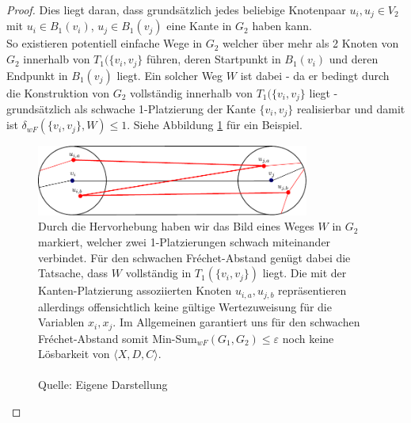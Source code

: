 \documentclass[a4paper, 12pt, twoside]{article}
\theoremstyle{Format1} %
\begin{document}
\begin{proof}
Dies liegt daran, dass grundsätzlich jedes beliebige Knotenpaar $u_{i}, u_{j} \in V_2$ mit $u_{i} \in B_1(v_i)$, $u_{j} \in B_1(v_j)$ eine Kante in $G_2$ haben kann.
\\
So existieren potentiell einfache Wege in $G_2$ welcher über mehr als 2 Knoten von $G_2$ innerhalb von $T_1(\{v_i, v_j\}$ führen, deren Startpunkt in $B_1(v_i)$ und deren Endpunkt in $B_1(v_j)$ liegt.
Ein solcher Weg $W$ ist dabei - da er bedingt durch die Konstruktion von $G_2$ vollständig innerhalb von $T_1(\{v_i, v_j\}$ liegt - grundsätzlich als
schwache 1-Platzierung der Kante $\{v_i, v_j\}$ realisierbar und damit ist $\delta_{wF}(\{v_i, v_j\}, W) \leq 1$. Siehe Abbildung \ref{chapter_4_example_0} für ein Beispiel.

\begin{figure}[H]
    \centering
    \includegraphics[width=0.8\textwidth]{chapter_4_example_0.pdf}
    \caption{Durch die Hervorhebung haben wir das Bild eines Weges $W$ in $G_2$ markiert, welcher zwei 1-Platzierungen schwach miteinander verbindet.
	Für den schwachen Fréchet-Abstand genügt dabei die Tatsache, dass $W$ vollständig in $T_1(\{v_i,v_j\})$ liegt.
	Die mit der Kanten-Platzierung assoziierten Knoten $u_{i,a},u_{j,b}$ repräsentieren allerdings offensichtlich keine gültige Wertezuweisung für die Variablen $x_i,x_j$.
	Im Allgemeinen garantiert uns für den schwachen Fréchet-Abstand somit Min-Sum$_{wF}(G_1,G_2) \leq \varepsilon$ noch keine Lösbarkeit von $\langle X,D,C \rangle$.
	\\
	\\
	Quelle: Eigene Darstellung
	}
	\label{chapter_4_example_0}
\end{figure}


\end{proof}
\end{document}
